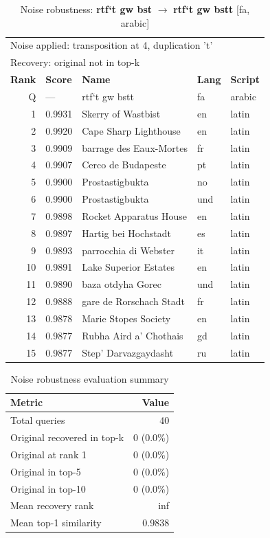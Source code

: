 \begin{table}[htbp]
\centering
\small
\caption{Noise robustness: \textbf{rtf`t gw bst} $\rightarrow$ \textbf{rtf`t gw bstt} [fa, arabic]}
\label{tab:noise-40}
\begin{tabular}{rllll}
\toprule
\multicolumn{5}{l}{\small Noise applied: transposition at 4, duplication 't'} \\
\multicolumn{5}{l}{\small Recovery: original not in top-k} \\
\midrule
\textbf{Rank} & \textbf{Score} & \textbf{Name} & \textbf{Lang} & \textbf{Script} \\
\midrule
\rowcolor{gray!20} Q & --- & rtf`t gw bstt & fa & arabic \\
\midrule
1 & 0.9931 & Skerry of Wastbist & en & latin \\
2 & 0.9920 & Cape Sharp Lighthouse & en & latin \\
3 & 0.9909 & barrage des Eaux-Mortes & fr & latin \\
4 & 0.9907 & Cerco de Budapeste & pt & latin \\
5 & 0.9900 & Prostastigbukta & no & latin \\
6 & 0.9900 & Prostastigbukta & und & latin \\
7 & 0.9898 & Rocket Apparatus House & en & latin \\
8 & 0.9897 & Hartig bei Hochstadt & es & latin \\
9 & 0.9893 & parrocchia di Webster & it & latin \\
10 & 0.9891 & Lake Superior Estates & en & latin \\
11 & 0.9890 & baza otdyha Gorec & und & latin \\
12 & 0.9888 & gare de Rorschach Stadt & fr & latin \\
13 & 0.9878 & Marie Stopes Society & en & latin \\
14 & 0.9877 & Rubha Aird a' Chothais & gd & latin \\
15 & 0.9877 & Step' Darvazgaydasht & ru & latin \\
\bottomrule
\end{tabular}
\end{table}

\begin{table}[htbp]
\centering
\caption{Noise robustness evaluation summary}
\label{tab:noise-summary}
\begin{tabular}{lr}
\toprule
\textbf{Metric} & \textbf{Value} \\
\midrule
Total queries & 40 \\
Original recovered in top-k & 0 (0.0\%) \\
Original at rank 1 & 0 (0.0\%) \\
Original in top-5 & 0 (0.0\%) \\
Original in top-10 & 0 (0.0\%) \\
\midrule
Mean recovery rank & inf \\
Mean top-1 similarity & 0.9838 \\
\bottomrule
\end{tabular}
\end{table}
